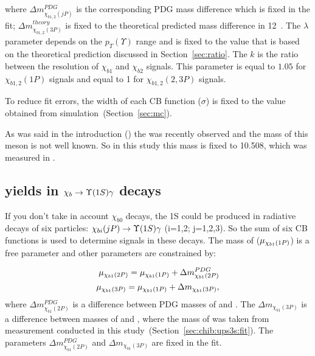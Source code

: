 \noindent where $\Delta m_{\chi_{b1,2}(jP)}^{PDG}$ is the corresponding PDG
mass difference which is fixed in the fit; $\Delta
m_{\chi_{b1,2}(3P)}^{theory}$ is fixed to the theoretical predicted mass
difference in 12\mevcc~\cite{Motyka:1997di}. The $\lambda$ parameter depends on
the $p_T(\Upsilon)$ range and is fixed to the value that is based on the
theoretical prediction discussed in Section~\ref{sec:ratio}. The $k$ 
is the ratio between the resolution of $\chi_{b1}$ and $\chi_{b2}$ signals.
This parameter is equal to $1.05$ for $\chi_{b1,2}(1P)$ signals and equal to 1
for $\chi_{b1,2}(2,3P)$ signals.

To reduce fit
errors, the width of each CB function ($\sigma$) is fixed to the value obtained
from simulation~(Section~\ref{sec:mc}).

As was said in the introduction () the \chibThreeP  was
recently observed and the mass of this meson is not well known.
So in this study this mass is fixed to 10.508\gevcc, which was measured in
.

\subsection{\texorpdfstring{\chib}{xb} yields in
\texorpdfstring{$\chib \to \Y1S \gamma$}{xb -> Y\(1S\) gamma } decays}
\label{sec:chib:ups1s:fit}

If you don't take in account $\chi_{b0}$ decays, the \Y1S could be produced in
radiative decays of six \chib particles: $\chi_{bi}(jP) \to \Y1S \gamma$
(i=1,2; j=1,2,3). So the sum of six CB functions is used to determine \chib
signals in these decays. The mass of \chiboneOneP ($\mu_{\chi_{{b} 1}(1P)}$) is a
free parameter and  other parameters are constrained by:

\begin{equation}
  \begin{aligned}
\mu_{\chi_{{b} 1}(2P)} = \mu_{\chi_{{b} 1}(1P)} + \Delta m_{\chi_{b1}(2P)}^{PDG} \\
\mu_{\chi_{{b} 1}(3P)} = \mu_{\chi_{{b} 1}(1P)} + \Delta m_{\chi_{b1}(3P)}, \\
  \end{aligned}
\end{equation}
\noindent where $\Delta m_{\chi_{b1}(2P)}^{PDG}$ is a difference between PDG masses of
\chiboneTwoP and \chiboneOneP. The $\Delta  m_{\chi_{b1}(3P)}$ is a difference
between masses of \chiboneThreeP and \chiboneOneP, where the mass of
\chiboneThreeP was taken from measurement conducted in this
study~(Section~\ref{sec:chib:ups3s:fit}). The parameters  $\Delta
m_{\chi_{b1}(2P)}^{PDG}$ and $\Delta  m_{\chi_{b1}(3P)}$ are fixed in the fit.


